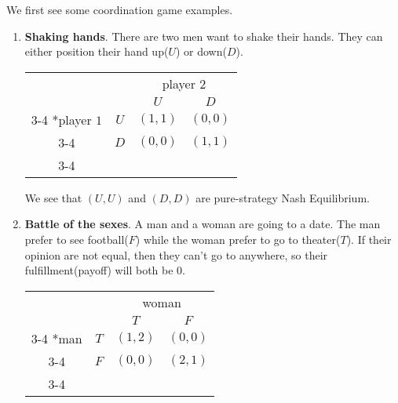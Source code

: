\begin{eg}
	We first see some coordination game examples.
	\begin{enumerate}
		\item \textbf{Shaking hands}. There are two men want to shake their hands. They can either position their hand up(\(U\)) or down(\(D\)).
		      \begin{table}[H]
			      \centering
			      \setlength{\extrarowheight}{2pt}
			      \begin{tabular}{cc|c|c|}
				                                & \multicolumn{1}{c}{} & \multicolumn{2}{c}{player $2$}                           \\
				                                & \multicolumn{1}{c}{} & \multicolumn{1}{c}{$U$}        & \multicolumn{1}{c}{$D$} \\\cline{3-4}
				      \multirow{2}*{player $1$} & $U$                  & $(1, 1)$                       & $(0, 0)$                \\\cline{3-4}
				                                & $D$                  & $(0, 0)$                       & $(1, 1)$                \\\cline{3-4}
			      \end{tabular}
		      \end{table}
		      We see that \((U, U)\) and \((D, D)\) are pure-strategy Nash Equilibrium.
		\item \textbf{Battle of the sexes}. A man and a woman are going to a date. The man prefer to see football(\(F\)) while the woman prefer to go to theater(\(T\)). If
		      their opinion are not equal, then they can't go to anywhere, so their fulfillment(payoff) will both be \(0\).
		      \begin{table}[H]
			      \centering
			      \setlength{\extrarowheight}{2pt}
			      \begin{tabular}{cc|c|c|}
				                         & \multicolumn{1}{c}{} & \multicolumn{2}{c}{woman}                           \\
				                         & \multicolumn{1}{c}{} & \multicolumn{1}{c}{$T$}   & \multicolumn{1}{c}{$F$} \\\cline{3-4}
				      \multirow{2}*{man} & $T$                  & $(1, 2)$                  & $(0, 0)$                \\\cline{3-4}
				                         & $F$                  & $(0, 0)$                  & $(2, 1)$                \\\cline{3-4}
			      \end{tabular}

\end{table}
\end{enumerate}
\end{eg}
